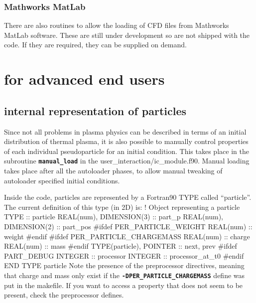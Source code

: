 \documentclass[12pt,a4paper]{article}
\newcommand{\inlinecode}[1]{{\color{warwickred} \bf\texttt{#1}}}
\newcommand{\EPOCH}{{\color{warwickdark}\fontfamily{phv}\selectfont{EPOCH}}}
\newenvironment{boxverbatim}{\lboxverbatim{none}}{\endlboxverbatim}
\begin{document}
\subsubsection{Mathworks MatLab}
There are also routines to allow the loading of CFD files from Mathworks
MatLab software. These are still under development so are not shipped with the
code. If they are required, they can be supplied on demand.

\section{{\EPOCH} for advanced end users}
\label{sec:advancedusers}

\subsection{{\EPOCH} internal representation of particles}
\label{partrep}
Since not all problems in plasma physics can be described in terms of an
initial distribution of thermal plasma, it is also possible to manually
control properties of each individual pseudoparticle for an initial
condition. This takes place in the subroutine \inlinecode{manual\_load} in the
user\_interaction/ic\_module.f90. Manual loading takes place after
all the autoloader phases, to allow manual tweaking of autoloader specified
initial conditions.

Inside the code, particles are represented by a Fortran90 TYPE called
``particle''. The current definition of this type (in 2D) is:
\begin{boxverbatim}
! Object representing a particle
  TYPE :: particle
    REAL(num), DIMENSION(3) :: part_p
    REAL(num), DIMENSION(2) :: part_pos
#ifdef PER_PARTICLE_WEIGHT
    REAL(num) :: weight
#endif
#ifdef PER_PARTICLE_CHARGEMASS
    REAL(num) :: charge
    REAL(num) :: mass
#endif
    TYPE(particle), POINTER :: next, prev
#ifdef PART_DEBUG
    INTEGER :: processor
    INTEGER :: processor_at_t0
#endif
  END TYPE particle
\end{boxverbatim}
Note the presence of the preprocessor directives, meaning that charge and mass
only exist if the \inlinecode{-DPER\_PARTICLE\_CHARGEMASS} define was put in
the makefile. If you want to access a property that does not seem to be
present, check the preprocessor defines.
\end{document}
